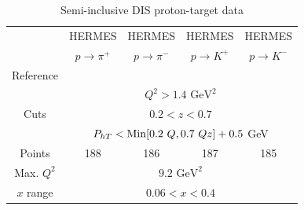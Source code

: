 \documentclass[aps,preprintnumbers,showpacs,nofootinbib,superscriptaddress,floatfix]{revtex4}
\newcommand{\Tperp}{T}
\begin{document}
\begin{table}[h]
\begin{center}
\begin{tabular}{|c|c|c|c|c|}
 \hline
  & HERMES & HERMES & HERMES & HERMES \\
 ~          &  $p \to \pi^+$    &   $p \to \pi^-$    &  $p \to K^+$    &   $p \to K^-$               \\
 \hline
 Reference & \multicolumn{4}{c|}{\cite{Airapetian:2012ki}}        \\
\hline
\multirow{3}{*}{Cuts}             & \multicolumn{4}{c|}{$Q^2 > 1.4 \text{ GeV}^2$}     \\
             & \multicolumn{4}{c|}{$0.2 <z <0.7$}     \\
             & \multicolumn{4}{c|}{$P_{h \Tperp}< {\rm Min}[0.2\ Q, 0.7 \ Q z ] +0.5$ GeV}     \\
\hline
 Points         &  188 & 186 & 187 & 185       \\
 \hline
Max. $Q^2$      &  \multicolumn{4}{c|}{$9.2 \text{ GeV}^2 $}               \\
 \hline
$x$ range       & \multicolumn{4}{c|}{$0.06 < x < 0.4$ }                \\
\hline
\end{tabular}
\caption{Semi-inclusive DIS proton-target data}
\end{center}
\end{table}
\end{document}
